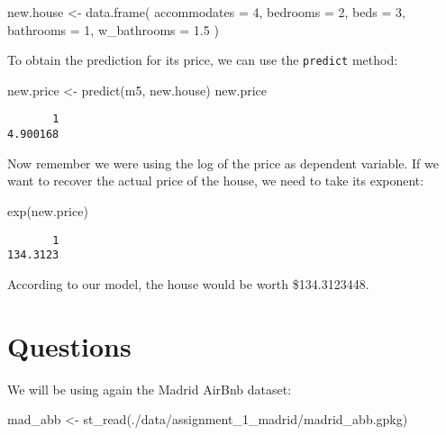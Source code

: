 \documentclass[
  letterpaper,
  krantz2]{style/krantz}
\newenvironment{Shaded}{\begin{snugshade}}{\end{snugshade}}
\newcommand{\AttributeTok}[1]{\textcolor[rgb]{0.40,0.45,0.13}{#1}}
\newcommand{\DecValTok}[1]{\textcolor[rgb]{0.68,0.00,0.00}{#1}}
\newcommand{\FloatTok}[1]{\textcolor[rgb]{0.68,0.00,0.00}{#1}}
\newcommand{\FunctionTok}[1]{\textcolor[rgb]{0.28,0.35,0.67}{#1}}
\newcommand{\NormalTok}[1]{\textcolor[rgb]{0.00,0.23,0.31}{#1}}
\newcommand{\OtherTok}[1]{\textcolor[rgb]{0.00,0.23,0.31}{#1}}
\newcommand{\StringTok}[1]{\textcolor[rgb]{0.13,0.47,0.30}{#1}}
\begin{document}
\begin{Shaded}
\begin{Highlighting}[]
\NormalTok{new.house }\OtherTok{\textless{}{-}} \FunctionTok{data.frame}\NormalTok{(}
  \AttributeTok{accommodates =} \DecValTok{4}\NormalTok{, }
  \AttributeTok{bedrooms =} \DecValTok{2}\NormalTok{,}
  \AttributeTok{beds =} \DecValTok{3}\NormalTok{,}
  \AttributeTok{bathrooms =} \DecValTok{1}\NormalTok{,}
  \AttributeTok{w\_bathrooms =} \FloatTok{1.5}
\NormalTok{)}
\end{Highlighting}
\end{Shaded}

To obtain the prediction for its price, we can use the \texttt{predict}
method:

\begin{Shaded}
\begin{Highlighting}[]
\NormalTok{new.price }\OtherTok{\textless{}{-}} \FunctionTok{predict}\NormalTok{(m5, new.house)}
\NormalTok{new.price}
\end{Highlighting}
\end{Shaded}

\begin{verbatim}
       1 
4.900168 
\end{verbatim}

Now remember we were using the log of the price as dependent variable.
If we want to recover the actual price of the house, we need to take its
exponent:

\begin{Shaded}
\begin{Highlighting}[]
\FunctionTok{exp}\NormalTok{(new.price)}
\end{Highlighting}
\end{Shaded}

\begin{verbatim}
       1 
134.3123 
\end{verbatim}

According to our model, the house would be worth \$134.3123448.

\hypertarget{questions-2}{%
\section{Questions}\label{questions-2}}

We will be using again the Madrid AirBnb dataset:

\begin{Shaded}
\begin{Highlighting}[]
\NormalTok{mad\_abb }\OtherTok{\textless{}{-}} \FunctionTok{st\_read}\NormalTok{(}\StringTok{\textquotesingle{}./data/assignment\_1\_madrid/madrid\_abb.gpkg\textquotesingle{}}\NormalTok{)}
\end{Highlighting}
\end{Shaded}
\end{document}
